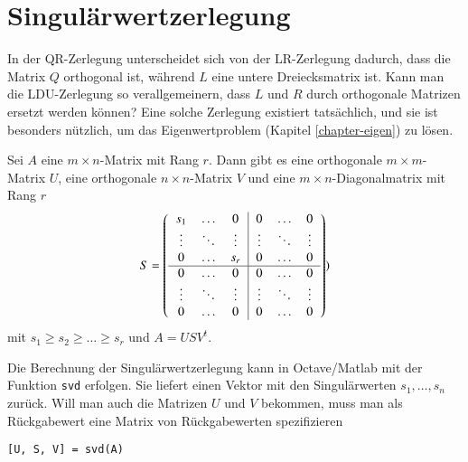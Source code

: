 %
%
%
\section{Singulärwertzerlegung\label{section-svd}}
In der QR-Zerlegung unterscheidet sich von der LR-Zerlegung
dadurch, dass die Matrix $Q$ orthogonal ist, während $L$ eine
untere Dreiecksmatrix ist.
Kann man die LDU-Zerlegung so verallgemeinern,
dass $L$ und $R$ durch orthogonale Matrizen ersetzt
werden können?  Eine solche Zerlegung existiert tatsächlich,
und sie ist besonders nützlich, um das Eigenwertproblem
(Kapitel \ref{chapter-eigen}) zu lösen.

\begin{satz}[Singulärwertzerlegung]\label{satz-svd}
Sei $A$ eine $m\times n$-Matrix mit Rang $r$.
Dann gibt es eine orthogonale $m\times m$-Matrix $U$, eine
orthogonale $n\times n$-Matrix $V$ und eine $m\times n$-Diagonalmatrix
mit Rang $r$ 
\begin{equation}
S=\left(
\begin{tabular}{>{$}c<{$}>{$}c<{$}>{$}c<{$}|>{$}c<{$}>{$}c<{$}>{$}c<{$}}
s_1   &\dots &0     &0     &\dots &0\\
\vdots&\ddots&\vdots&\vdots&\ddots&\vdots\\
0     &\dots &s_r   &0     &\dots &0\\
\hline
0     &\dots &0     &0     &\dots &0\\
\vdots&\ddots&\vdots&\vdots&\ddots&\vdots\\
0     &\dots &0     &0     &\dots &0\\
\end{tabular}
\right)
\label{s-matrix})
\end{equation}
mit $s_1\ge s_2\ge\dots \ge s_r$ und $A=USV^t$.
\end{satz}

Die Berechnung der Singulärwertzerlegung kann in Octave/Matlab
mit der Funktion {\tt svd} erfolgen.
Sie liefert einen Vektor mit den Singulärwerten $s_1,\dots,s_n$ zurück.
Will man auch die Matrizen $U$ und $V$ bekommen, muss man als Rückgabewert
eine Matrix von Rückgabewerten spezifizieren
\begin{verbatim}
[U, S, V] = svd(A)
\end{verbatim}

